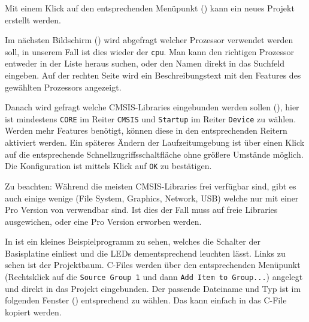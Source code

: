 
Mit einem Klick auf den entsprechenden Menüpunkt () kann ein neues \uVision{} Projekt erstellt werden.


Im nächsten Bildschirm () wird abgefragt welcher Prozessor verwendet werden soll, in unserem Fall ist dies wieder der \texttt{\gls{cpu}}. Man kann den richtigen Prozessor entweder in der Liste heraus suchen, oder den Namen direkt in das Suchfeld eingeben. Auf der rechten Seite wird ein Beschreibungstext mit den Features des gewählten Prozessors angezeigt.


Danach wird gefragt welche \gls{CMSIS}-Libraries eingebunden werden sollen (), hier ist mindestens \texttt{CORE} im Reiter \texttt{CMSIS} und \texttt{Startup} im Reiter \texttt{Device} zu wählen. Werden mehr Features benötigt, können diese in den entsprechenden Reitern aktiviert werden. Ein späteres Ändern der Laufzeitumgebung ist über einen Klick auf die entsprechende Schnellzugriffsschaltfläche ohne größere Umstände möglich. Die Konfiguration ist mittels Klick auf \texttt{OK} zu bestätigen.

\begin{warning}
  Zu beachten: Während die meisten \gls{CMSIS}-Libraries frei verfügbar sind, gibt es auch einige wenige (File System, Graphics, Network, USB) welche nur mit einer Pro Version von \uVision{} verwendbar sind. Ist dies der Fall muss auf freie Libraries ausgewichen, oder eine Pro Version erworben werden.
\end{warning}


In  ist ein kleines Beispielprogramm zu sehen, welches die Schalter der \gls{Basisplatine} einliest und die LEDs dementsprechend leuchten lässt. Links zu sehen ist der Projektbaum. \gls{C}-Files werden über den entsprechenden Menüpunkt (Rechtsklick auf die \texttt{Source Group 1} und dann \texttt{Add Item to Group...}) angelegt und direkt in das Projekt eingebunden. Der passende Dateiname und Typ ist im folgenden Fenster () entsprechend zu wählen. Das  kann einfach in das \gls{C}-File kopiert werden.

